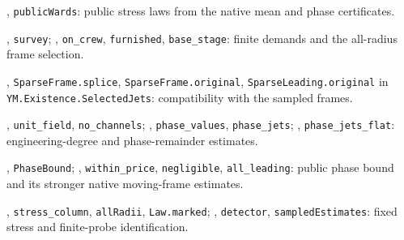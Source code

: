 \documentclass[11pt]{article}
\newcommand{\code}[1]{{\small\nolinkurl{#1}}}
\begin{document}
\begin{description}[style=nextline,leftmargin=3.5em,labelwidth=3em,align=left]
\item[N19] , \code{publicWards}: public stress laws from the native mean and phase certificates.
\item[N20] , \code{survey}; , \code{on_crew}, \code{furnished}, \code{base_stage}: finite demands and the all-radius frame selection.
\item[N21] , \code{SparseFrame.splice}, \code{SparseFrame.original}, \code{SparseLeading.original} in \code{YM.Existence.SelectedJets}: compatibility with the sampled frames.
\item[N22] , \code{unit_field}, \code{no_channels}; , \code{phase_values}, \code{phase_jets}; , \code{phase_jets_flat}: engineering-degree and phase-remainder estimates.
\item[N23] , \code{PhaseBound}; , \code{within_price}, \code{negligible}, \code{all_leading}: public phase bound and its stronger native moving-frame estimates.
\item[N24] , \code{stress_column}, \code{allRadii}, \code{Law.marked}; , \code{detector}, \code{sampledEstimates}: fixed stress and finite-probe identification.
\end{description}
\end{document}

